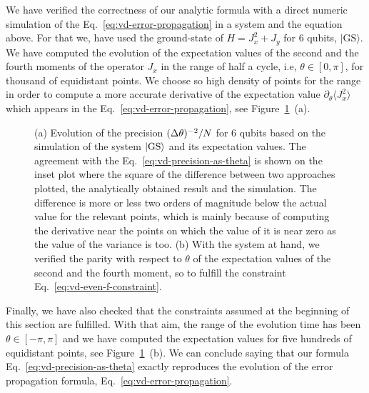 We have verified the correctness of our analytic formula with a direct numeric simulation of the Eq.~\eqref{eq:vd-error-propagation} in a system and the equation above.
For that we, have used the ground-state of $H=J_x^2+J_y$ for 6 qubits, $|\text{GS}\rangle$.
We have computed the evolution of the expectation values of the second and the fourth moments of the operator $J_x$ in the range of half a cycle, i.e, $\theta \in [0,\pi]$, for thousand of equidistant points.
We choose so high density of points for the range in order to compute a more accurate derivative of the expectation value $\partial_{\theta} \langle J_x^2\rangle$ which appears in the Eq.~\eqref{eq:vd-error-propagation}, see Figure~\ref{fig:vd-evolution-of-precision}~(a).
\begin{figure}[htp]
  \centering
  \caption[(a) Evolution of $\varinv{\theta}/N$. (b) Evolution of the expectation values]{(a) Evolution of the precision $\varinv{\theta}/N$ for 6 qubits based on the simulation of the system $\vert \text{GS} \rangle$ and its expectation values.
  The agreement with the Eq.~\eqref{eq:vd-precision-as-theta} is shown on the inset plot where the square of the difference between two approaches plotted, the analytically obtained result and the simulation.
  The difference is more or less two orders of magnitude below the actual value for the relevant points, which is mainly because of computing the derivative near the points on which the value of it is near zero as the value of the variance is too.
  (b) With the system at hand, we verified the parity with respect to $\theta$ of the expectation values of the second and the fourth moment, so to fulfill the constraint Eq.~\eqref{eq:vd-even-f-constraint}.}
  \label{fig:vd-evolution-of-precision}
\end{figure}
Finally, we have also checked that the constraints assumed at the beginning of this section are fulfilled.
With that aim, the range of the evolution time has been $\theta \in [-\pi,\pi]$ and we have computed the expectation values for five hundreds of equidistant points, see Figure~\ref{fig:vd-evolution-of-precision}~(b).
We can conclude saying that our formula Eq.~\eqref{eq:vd-precision-as-theta} exactly reproduces the evolution of the error propagation formula, Eq.~\eqref{eq:vd-error-propagation}.

